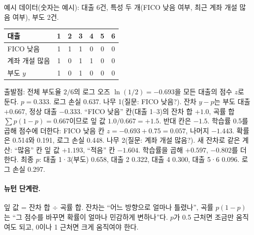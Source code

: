 \begin{workout}
 예시 데이터(숫자는 예시): 대출 6건, 특성 두 개(FICO 낮음 여부, 최근 계좌 개설 많음 여부), 부도 2건.
\begin{center}\small
\begin{tabular}{@{}lcccccc@{}}\toprule
대출 & 1 & 2 & 3 & 4 & 5 & 6\\\midrule
FICO 낮음 & 1 & 1 & 1 & 0 & 0 & 0\\
계좌 개설 많음 & 1 & 0 & 1 & 1 & 0 & 0\\
부도 $y$ & 1 & 0 & 1 & 0 & 0 & 0\\\bottomrule
\end{tabular}\end{center}
 출발점: 전체 부도율 $2/6$의 로그 오즈 $\ln(1/2)=-0.693$을 모든 대출의 점수 $z$로 둔다. $p=0.333$. 로그 손실 0.637. 
 나무 1(질문: FICO 낮음?). 잔차 $y-p$는 부도 대출 $+0.667$, 정상 대출 $-0.333$. ``FICO 낮음'' 칸(대출 1--3)의 잔차 합 $+1.0$, 곡률 합 $\sum p(1-p)=0.667$이므로 잎 값 $1.0/0.667=+1.5$. 반대 칸은 $-1.5$. 
 학습률 0.5를 곱해 점수에 더한다: FICO 낮음 칸 $z=-0.693+0.75=0.057$, 나머지 $-1.443$. 확률은 0.514와 0.191, 로그 손실 0.448.
 나무 2(질문: 계좌 개설 많음?). 새 잔차로 같은 계산: ``많음'' 칸 잎 값 $+1.193$, ``적음'' 칸 $-1.604$. 학습률을 곱해 $+0.597$, $-0.802$를 더한다.
 최종 $p$: 대출 1·\allowbreak{}3(부도) 0.658, 대출 2 0.322, 대출 4 0.300, 대출 5·\allowbreak{}6 0.096. 로그 손실 0.297.
\end{workout}

\paragraph{뉴턴 단계란.} 잎 값 = 잔차 합 \ensuremath{\div} 곡률 합. 잔차는 ``어느 방향으로 얼마나 틀렸나'', 곡률 $p(1-p)$는 ``그 점수를 바꾸면 확률이 얼마나 민감하게 변하나''다. $p$가 0.5 근처면 조금만 움직여도 되고, 0이나 1 근처면 크게 움직여야 한다.

